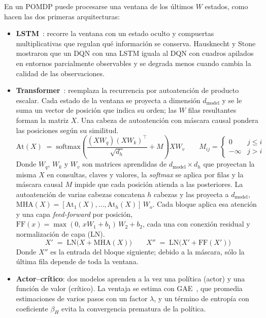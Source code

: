 \documentclass[../00_Main/Main.tex]{subfiles}
\begin{document}
En un POMDP puede procesarse una ventana de los \'ultimos $W$ estados, como hacen las dos
primeras arquitecturas:

\begin{itemize}
    \item \textbf{LSTM}~\citep{Hochreiter1997}: recorre la ventana con un
    estado oculto y compuertas multiplicativas que regulan qu\'e informaci\'on se conserva. Hausknecht y
    Stone~\citep{Hausknecht2015} mostraron que un DQN con una LSTM iguala
    al DQN con cuadros apilados en entornos parcialmente observables y se
    degrada menos cuando cambia la calidad de las observaciones.
    \item \textbf{Transformer}~\citep{Vaswani2017}: reemplaza la
    recurrencia por autoatenci\'on de producto escalar. Cada estado de la
    ventana se proyecta a dimensi\'on $d_{\mathrm{model}}$ y se le suma un
    vector de posici\'on que indica su orden; las $W$ filas resultantes
    forman la matriz $X$. Una cabeza de autoatenci\'on con m\'ascara causal
    pondera las posiciones seg\'un su similitud.
    \begin{equation}
    \mathrm{At}(X) \;=\; \mathrm{softmax}\!\left(\frac{(XW_q)(XW_k)^{\top}}{\sqrt{d_h}} + M\right) XW_v
    \qquad
    M_{ij} = \begin{cases} 0 & j \le i \\ -\infty & j > i \end{cases}
    \label{eq:attention}
    \end{equation}
    Donde $W_q$, $W_k$ y $W_v$ son matrices aprendidas de
    $d_{\mathrm{model}} \times d_h$ que proyectan la misma $X$ en consultas,
    claves y valores, la \emph{softmax} se aplica por filas y
    la m\'ascara causal $M$ impide que cada posici\'on atienda a las
    posteriores. La autoatenci\'on de varias cabezas concatena $h$ cabezas
    y las proyecta a $d_{\mathrm{model}}$,
    $\mathrm{MHA}(X) = [\mathrm{At}_1(X), \ldots, \mathrm{At}_h(X)]\,W_o$.
    Cada bloque aplica esa atenci\'on y una capa \emph{feed-forward} por
    posici\'on, $\mathrm{FF}(x) = \max(0,\, x W_1 + b_1)\, W_2 + b_2$, cada
    una con conexi\'on residual y normalizaci\'on de capa (LN).
    \begin{equation}
    X' \;=\; \mathrm{LN}\big(X + \mathrm{MHA}(X)\big)
    \qquad
    X'' \;=\; \mathrm{LN}\big(X' + \mathrm{FF}(X')\big)
    \label{eq:trf-block}
    \end{equation}
    Donde $X''$ es la entrada del bloque siguiente; debido a la m\'ascara, s\'olo
    la \'ultima fila depende de toda la ventana.
    \item \textbf{Actor--cr\'itico}: dos modelos aprenden a la vez una
    pol\'itica (actor) y una funci\'on de valor (cr\'itico). La
    ventaja se estima con GAE~\citep{Schulman2016}, que promedia
    estimaciones de varios pasos con un factor $\lambda$, y un t\'ermino
    de entrop\'ia con coeficiente $\beta_H$ evita la convergencia
    prematura de la pol\'itica.
\end{itemize}
\end{document}
